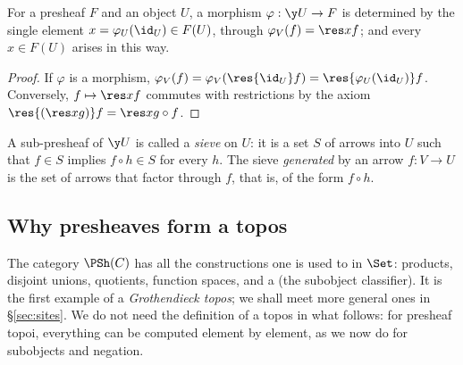 \begin{lemma}\label{lem:yoneda}
For a presheaf $F$ and an object $U$, a morphism $\varphi : \y U\to F$ is determined by the single element $x = \varphi_U(\id_U)\in F(U)$, through $\varphi_V(f) = \res xf$; and every $x\in F(U)$ arises in this way.
\end{lemma}

\begin{proof}
If $\varphi$ is a morphism, $\varphi_V(f) = \varphi_V(\res{\id_U}f) = \res{\varphi_U(\id_U)}f$. Conversely, $f\mapsto\res xf$ commutes with restrictions by the axiom $\res{(\res xg)}f = \res x{g\circ f}$.
\end{proof}

A sub-presheaf of $\y U$ is called a \emph{sieve} on $U$: it is a set $S$ of arrows into $U$ such that $f\in S$ implies $f\circ h\in S$ for every $h$. The sieve \emph{generated} by an arrow $f : V\to U$ is the set of arrows that factor through $f$, that is, of the form $f\circ h$.

\subsection{Why presheaves form a topos}

The category $\PSh(C)$ has all the constructions one is used to in $\Set$: products, disjoint unions, quotients, function spaces, and a  (the subobject classifier). It is the first example of a \emph{Grothendieck topos}; we shall meet more general ones in \S\ref{sec:sites}. We do not need the definition of a topos in what follows: for presheaf topoi, everything can be computed element by element, as we now do for subobjects and negation.
